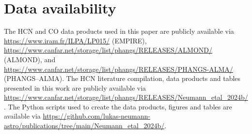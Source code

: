 \documentclass[letter, longauth]{aa} %
\begin{document}
\section*{Data availability}
The HCN and CO data products used in this paper are publicly available via \url{https://www.iram.fr/ILPA/LP015/} (EMPIRE),
\url{https://www.canfar.net/storage/list/phangs/RELEASES/ALMOND/} (ALMOND), and
\url{https://www.canfar.net/storage/list/phangs/RELEASES/PHANGS-ALMA/} (PHANGS--ALMA).
The HCN literature compilation, data products and tables presented in this work are publicly available via \url{https://www.canfar.net/storage/list/phangs/RELEASES/Neumann_etal_2024b/}.
The Python scripts used to create the data products, figures and tables are available via \url{https://github.com/lukas-neumann-astro/publications/tree/main/Neumann_etal_2024b/}.




\end{document}
